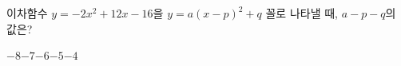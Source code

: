 이차함수 $y=-2x^2+12x-16$을 $y=a(x-p)^2+q$ 꼴로 나타낼 때, $a-p-q$의 값은? 
\begin{choices32}{$-8$}{$-7$}{$-6$}{$-5$}{$-4$}\end{choices32}
